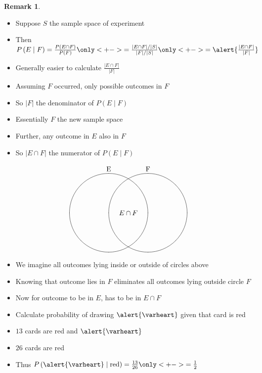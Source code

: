 \documentclass[handout]{beamer}
\theoremstyle{definition}
\newtheorem{remark}{Remark}
\begin{document}
\begin{frame}
\begin{remark}
\begin{itemize}
\item Suppose $S$ the sample space of experiment
\item Then
$P\left(E\mid F\right)=\frac{P\left(E\cap F\right)}{P\left(F\right)}
\only<+->{=\frac{\left|E\cap F\right|/\left|S\right|}
{\left|F\right|/\left|S\right|}}
\only<+->{=\alert{\frac{\left|E\cap F\right|}{\left|F\right|}}}$
\item Generally easier to calculate
$\frac{\left|E\cap F\right|}{\left|F\right|}$
\item Assuming $F$ occurred, only possible outcomes in $F$
\item So $\left|F\right|$ the denominator of $P\left(E\mid F\right)$
\item Essentially $F$ the \alert{new sample space}
\item Further, any outcome in $E$
also in $F$
\item So $\left|E\cap F\right|$ the numerator of
$P\left(E\mid F\right)$
\end{itemize}
\end{remark}
\end{frame}

\begin{frame}
\[\begin{xy}<1cm,0cm>:
(-1,2)*+!D{\text{E}};
(1,2)*+!D{\text{F}};
(-1,0)*\cir<2cm>{};
(1,0)*\cir<2cm>{};
(0,0)*{E\cap F};
\end{xy}\]
\begin{itemize}
\item We imagine all outcomes lying inside
or outside of circles above
\item Knowing that outcome lies in $F$
eliminates all outcomes lying outside circle $F$
\item Now for outcome to be in $E$, has to be in $E\cap F$
\end{itemize}
\end{frame}

\begin{frame}
\begin{example}
\begin{itemize}
\item Calculate probability of drawing $\alert{\varheart}$ given
that card is red
\item $13$ cards are red and $\alert{\varheart}$
\item $26$ cards are red
\item Thus $P\left(\alert{\varheart}\mid\text{red}\right)
=\frac{13}{26}\only<+->{=\frac{1}{2}}$
\end{itemize}
\end{example}
\end{frame}
\end{document}
